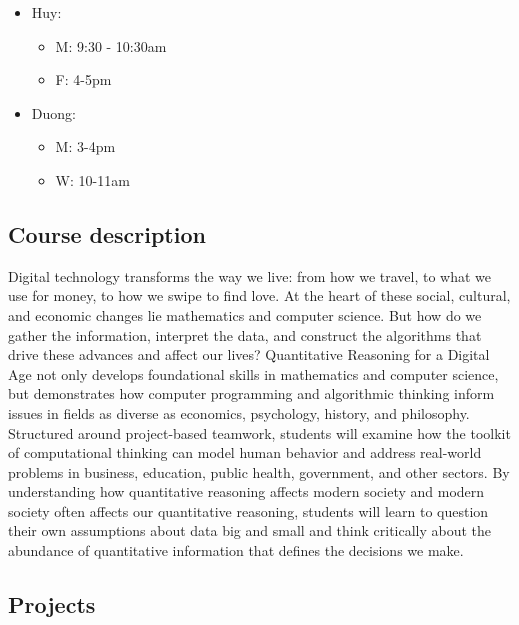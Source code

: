 \documentclass[
]{article}
\providecommand{\tightlist}{%
  \setlength{\itemsep}{0pt}\setlength{\parskip}{0pt}}
\begin{document}
\begin{itemize}
  \begin{itemize}
  \tightlist
  \item
    Huy:

    \begin{itemize}
    \tightlist
    \item
      M: 9:30 - 10:30am
    \item
      F: 4-5pm
    \end{itemize}
  \item
    Duong:

    \begin{itemize}
    \tightlist
    \item
      M: 3-4pm
    \item
      W: 10-11am
    \end{itemize}
  \end{itemize}
\end{itemize}

\hypertarget{course-description}{%
\subsection*{Course description}\label{course-description}}

Digital technology transforms the way we live: from how we travel, to what we use for money, to how we swipe to find love.
At the heart of these social, cultural, and economic changes lie mathematics and computer science. But how do we gather the information, interpret the data, and construct the algorithms that drive these advances and affect our lives? Quantitative Reasoning for a Digital Age not only develops foundational skills in mathematics and computer science, but demonstrates how computer programming and algorithmic thinking inform issues in fields as diverse as economics, psychology, history, and philosophy. Structured around project-based teamwork, students will examine how the toolkit of computational thinking can model human behavior and address real-world problems in business, education, public health, government, and other sectors. By understanding how quantitative reasoning affects modern society and modern society often affects our quantitative reasoning, students will learn to question their own assumptions about data big and small and think critically about the abundance of quantitative information that defines the decisions we make.

\hypertarget{projects}{%
\subsection*{Projects}\label{projects}}
\end{document}

